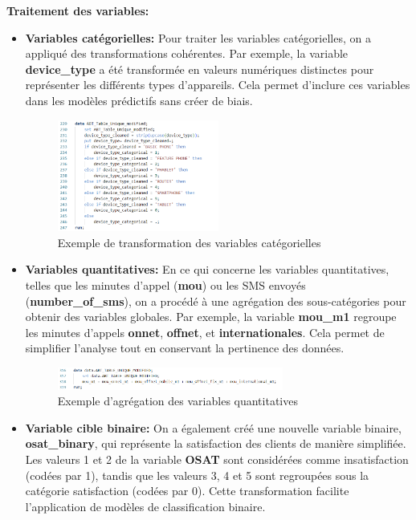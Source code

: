 \noindent \textbf{\checkmark Traitement des variables:}
\begin{itemize}
    \item \textbf{Variables catégorielles:} Pour traiter les variables catégorielles, on a appliqué des transformations cohérentes. Par exemple, la variable \textbf{device\_type} a été transformée en valeurs numériques distinctes pour représenter les différents types d'appareils. Cela permet d'inclure ces variables dans les modèles prédictifs sans créer de biais.

    \begin{figure}[H]
        \centering
        \includegraphics[width=0.5\textwidth]{capture_sas_3.png}
        \caption{Exemple de transformation des variables catégorielles}
        \label{fig:categorical_example}
    \end{figure}

    \item \textbf{Variables quantitatives:} En ce qui concerne les variables quantitatives, telles que les minutes d'appel (\textbf{mou}) ou les SMS envoyés (\textbf{number\_of\_sms}), on a procédé à une agrégation des sous-catégories pour obtenir des variables globales. Par exemple, la variable \textbf{mou\_m1} regroupe les minutes d'appels \textbf{onnet}, \textbf{offnet}, et \textbf{internationales}. Cela permet de simplifier l'analyse tout en conservant la pertinence des données.

    \begin{figure}[H]
        \centering
        \includegraphics[width=0.7\textwidth]{capture_sas_4.png}
        \caption{Exemple d'agrégation des variables quantitatives}
        \label{fig:quantitative_example}
    \end{figure}

    \item \textbf{Variable cible binaire:} On a également créé une nouvelle variable binaire, \textbf{osat\_binary}, qui représente la satisfaction des clients de manière simplifiée. Les valeurs 1 et 2 de la variable \textbf{OSAT} sont considérées comme insatisfaction (codées par 1), tandis que les valeurs 3, 4 et 5 sont regroupées sous la catégorie satisfaction (codées par 0). Cette transformation facilite l'application de modèles de classification binaire.

\end{itemize}

